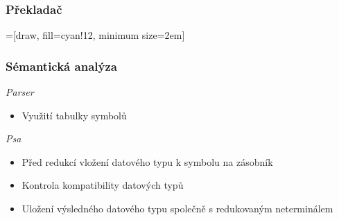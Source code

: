 

\begin{frame}
  \frametitle{Překladač}
  =[draw, fill=cyan!12, minimum size=2em]

\end{frame}



\begin{frame}
  \frametitle{Sémantická analýza}
  \emph{Parser}
    \begin{itemize}
        \item Využití tabulky symbolů
    \end{itemize}
    \emph{Psa}
    \begin{itemize}
        \item Před redukcí vložení datového typu k symbolu na zásobník
        \item Kontrola kompatibility datových typů
        \item Uložení výsledného datového typu společně s redukovaným neterminálem
    \end{itemize}
\end{frame}



